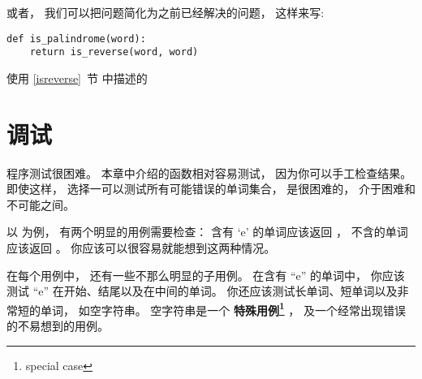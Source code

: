 或者， 我们可以把问题简化为之前已经解决的问题， 这样来写:


\begin{lstlisting}
def is_palindrome(word):
    return is_reverse(word, word)
\end{lstlisting}


使用 \ref{isreverse}~节 中描述的 


\section{调试}
    


程序测试很困难。  本章中介绍的函数相对容易测试， 因为你可以手工检查结果。
即使这样， 选择一可以测试所有可能错误的单词集合， 是很困难的， 介于困难和不可能之间。


以  为例， 有两个明显的用例需要检查：
含有 `e' 的单词应该返回 ， 不含的单词应该返回  。
你应该可以很容易就能想到这两种情况。


在每个用例中， 还有一些不那么明显的子用例。
在含有 ``e'' 的单词中， 你应该测试 ``e'' 在开始、结尾以及在中间的单词。
你还应该测试长单词、短单词以及非常短的单词， 如空字符串。
空字符串是一个 {\bf 特殊用例\footnote{special case}} ， 及一个经常出现错误的不易想到的用例。


